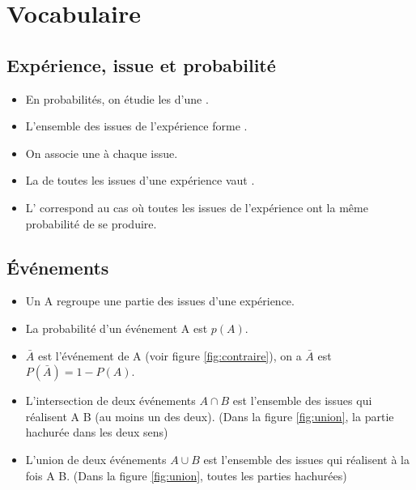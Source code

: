 \documentclass[12pt,a4paper]{article}
\date{}
\title{}
\begin{document}
{}

\section{Vocabulaire}

\subsection{Expérience, issue et probabilité}
\begin{mydefs}
	\begin{itemize}
		\item En probabilités, on étudie les  d'une .
		\item L'ensemble des issues de l'expérience forme .
		\item On associe une  à chaque issue.
		\item La  de toutes les issues d'une expérience vaut .
		\item L' correspond au cas où toutes les issues de l'expérience ont la même probabilité de se produire.
	\end{itemize}

	
\end{mydefs}



\subsection{\'Evénements}

\begin{mydefs}
	\begin{itemize}
		\item Un  A regroupe une partie des issues d'une expérience.
		\item La probabilité d'un événement A est $p(A)$.
		\item $\bar{A}$ est l'événement  de A (voir figure \ref{fig:contraire}), on a $\bar{A}$ est $P(\bar{A}) = 1 - P(A)$.
		\item L'intersection de deux événements $A \cap B$ est l'ensemble des issues qui réalisent A  B (au moins un des deux). (Dans la figure \ref{fig:union}, la partie hachurée dans les deux sens)
		\item L'union de deux événements $A \cup B$ est l'ensemble des issues qui réalisent à la fois A  B. (Dans la figure \ref{fig:union}, toutes les parties hachurées)
		
	\end{itemize}
\end{mydefs}
\end{document}
